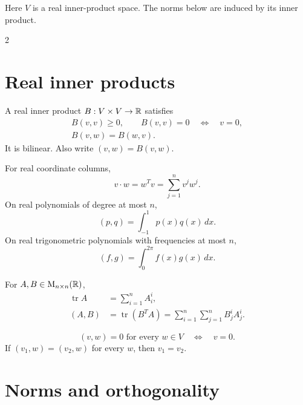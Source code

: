 \begin{fullwidth}
  Here \(V\) is a real inner-product space. The norms below are induced by
  its inner product.

  \begin{multicols}{2}
    \raggedcolumns
    \section{Real inner products}
    \label{sec:appendix:formula-sheet-real-inner-products}

    A real inner product \(B:V\times V\to\mathbb{R}\) satisfies
    \[
      \begin{gathered}
        B(v,v)\ge0,\qquad B(v,v)=0\quad\Longleftrightarrow\quad v=0,\\
        B(v,w)=B(w,v).
      \end{gathered}
    \]
    It is bilinear. Also write \((v,w)=B(v,w)\).

    For real coordinate columns,
    \[
      v\cdot w=w^Tv=\sum_{j=1}^n v^jw^j.
    \]
    On real polynomials of degree at most \(n\),
    \[
      (p,q)=\int_{-1}^1p(x)q(x)\,dx.
    \]
    On real trigonometric polynomials with frequencies at most \(n\),
    \[
      (f,g)=\int_0^{2\pi}f(x)g(x)\,dx.
    \]

    For \(A,B\in\mathrm M_{n\times n}(\mathbb{R})\),
    \[
      \begin{aligned}
        \operatorname{tr}A&=\sum_{i=1}^n A^i_i,\\
        (A,B)&=\operatorname{tr}(B^TA)
          =\sum_{i=1}^n\sum_{j=1}^n B^i_jA^i_j.
      \end{aligned}
    \]

    \[
      (v,w)=0\text{ for every }w\in V
      \quad\Longleftrightarrow\quad v=0.
    \]
    If \((v_1,w)=(v_2,w)\) for every \(w\), then \(v_1=v_2\).

    \columnbreak
    \section{Norms and orthogonality}
    \label{sec:appendix:formula-sheet-norms-and-orthogonality}


\end{multicols}
\end{fullwidth}
